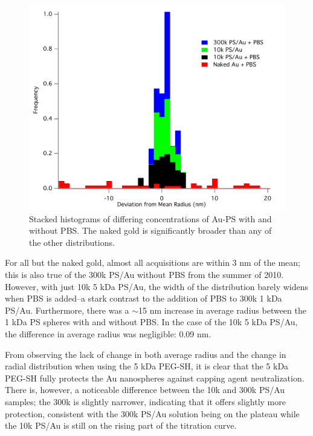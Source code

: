 \begin{figure}[htbp]
\centering
\includegraphics[keepaspectratio,width=5in,height=0.75\textheight]{RadiusHistPBS.pdf}
\caption{Stacked histograms of differing concentrations of Au-PS with and without PBS. The naked gold is significantly broader than any of the other distributions.}
\label{protection}
\end{figure}



For all but the naked gold, almost all acquisitions are within 3 nm of the mean; this is also true of the 300k PS\slash Au without PBS from the summer of 2010. However, with just 10k 5 kDa PS\slash Au, the width of the distribution barely widens when PBS is added--a stark contrast to the addition of PBS to 300k 1 kDa PS\slash Au. Furthermore, there was a \ensuremath{\sim}15 nm increase in average radius between the 1 kDa PS spheres with and without PBS. In the case of the 10k 5 kDa PS\slash Au, the difference in average radius was negligible: 0.09 nm.

From observing the lack of change in both average radius and the change in radial distribution when using the 5 kDa PEG-SH, it is clear that the 5 kDa PEG-SH fully protects the Au nanospheres against capping agent neutralization. There is, however, a noticeable difference between the 10k and 300k PS\slash Au samples; the 300k is slightly narrower, indicating that it offers slightly more protection, consistent with the 300k PS\slash Au solution being on the plateau while the 10k PS\slash Au is still on the rising part of the titration curve.